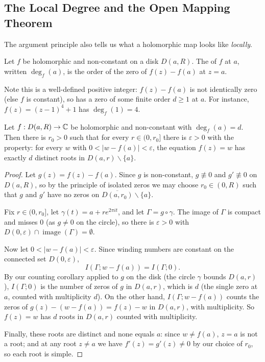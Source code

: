 \documentclass[a4paper]{scrartcl}
\begin{document}
\subsection{The Local Degree and the Open Mapping Theorem}

The argument principle also tells us what a holomorphic map looks like \emph{locally}.

\begin{definition}
    Let $f$ be holomorphic and non-constant on a disk $D(a, R)$. The  of $f$ at $a$, written $\deg_f(a)$, is the order of the zero of $f(z) - f(a)$ at $z = a$.
\end{definition}

Note this is a well-defined positive integer: $f(z) - f(a)$ is not identically zero (else $f$ is constant), so has a zero of some finite order $d \geq 1$ at $a$. For instance, $f(z) = (z - 1)^4 + 1$ has $\deg_f(1) = 4$.

\begin{theorem}
    Let $f: D(a, R) \rightarrow \mathbb{C}$ be holomorphic and non-constant with $\deg_f(a) = d$. Then there is $r_0 > 0$ such that for every $r \in (0, r_0]$ there is $\varepsilon > 0$ with the property: for every $w$ with $0 < |w - f(a)| < \varepsilon$, the equation $f(z) = w$ has exactly $d$ distinct roots in $D(a, r) \backslash \{a\}$.
\end{theorem}
\begin{proof}
    Let $g(z) = f(z) - f(a)$. Since $g$ is non-constant, $g \not\equiv 0$ and $g' \not\equiv 0$ on $D(a, R)$, so by the principle of isolated zeros we may choose $r_0 \in (0, R)$ such that $g$ and $g'$ have no zeros on $\overline{D(a, r_0)} \backslash \{a\}$.

    Fix $r \in (0, r_0]$, let $\gamma(t) = a + re^{2 \pi i t}$, and let $\Gamma = g \circ \gamma$. The image of $\Gamma$ is compact and misses $0$ (as $g \neq 0$ on the circle), so there is $\varepsilon > 0$ with $D(0, \varepsilon) \cap \operatorname{image}(\Gamma) = \emptyset$.

    Now let $0 < |w - f(a)| < \varepsilon$. Since winding numbers are constant on the connected set $D(0, \varepsilon)$,
    $$
    I(\Gamma; w - f(a)) = I(\Gamma; 0).
    $$
    By our counting corollary applied to $g$ on the disk (the circle $\gamma$ bounds $D(a, r)$), $I(\Gamma; 0)$ is the number of zeros of $g$ in $D(a, r)$, which is $d$ (the single zero at $a$, counted with multiplicity $d$). On the other hand, $I(\Gamma; w - f(a))$ counts the zeros of $g(z) - (w - f(a)) = f(z) - w$ in $D(a, r)$, with multiplicity. So $f(z) = w$ has $d$ roots in $D(a, r)$ counted with multiplicity.

    Finally, these roots are distinct and none equals $a$: since $w \neq f(a)$, $z = a$ is not a root; and at any root $z \neq a$ we have $f'(z) = g'(z) \neq 0$ by our choice of $r_0$, so each root is simple.
\end{proof}
\end{document}
